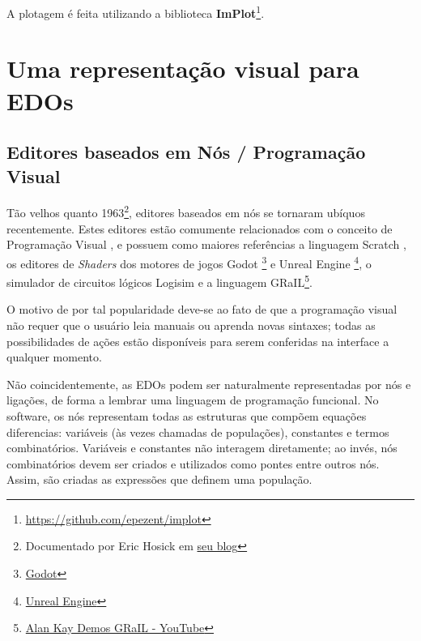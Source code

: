 \documentclass[
	12pt,				%
	openright,			%
	oneside,			%
	a4paper,			%
	main=brazil,
	english,			%
	]{ufsj-abntex2}
\begin{document}
% 

A plotagem é feita utilizando a biblioteca \textbf{ImPlot}\footnote{\href{https://github.com/epezent/implot}{https://github.com/epezent/implot}}.

\section{Uma representação visual para EDOs}

\subsection{Editores baseados em Nós / Programação Visual}

Tão velhos quanto 1963\footnote{Documentado por Eric Hosick em \href{http://blog.interfacevision.com/design/design-visual-progarmming-languages-snapshots/}{seu blog}}, editores baseados em nós se tornaram ubíquos recentemente. Estes editores estão comumente relacionados com o conceito de Programação Visual \cite{VisualProgramming}, e possuem como maiores referências a linguagem Scratch \cite{scratchlang}, os editores de \textit{Shaders} dos motores de jogos Godot \footnote{\href{https://godotengine.org/}{Godot}} e Unreal Engine \footnote{\href{https://www.unrealengine.com/}{Unreal Engine}}, o simulador de circuitos lógicos Logisim \cite{logisim} e a linguagem GRaIL\footnote{\href{https://www.youtube.com/watch?v=QQhVQ1UG6aM}{Alan Kay Demos GRaIL - YouTube}}.

O motivo de por tal popularidade deve-se ao fato de que a programação visual não requer que o usuário leia manuais ou aprenda novas sintaxes; todas as possibilidades de ações estão disponíveis para serem conferidas na interface a qualquer momento.

Não coincidentemente, as EDOs podem ser naturalmente representadas por nós e ligações, de forma a lembrar uma linguagem de programação funcional. No software, os nós representam todas as estruturas que compõem equações diferencias: variáveis (às vezes chamadas de populações), constantes e termos combinatórios. Variáveis e constantes não interagem diretamente; ao invés, nós combinatórios devem ser criados e utilizados como pontes entre outros nós. Assim, são criadas as expressões que definem uma população.
\end{document}
